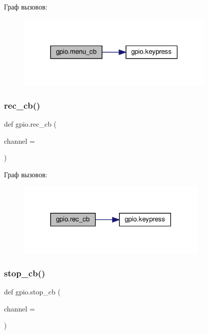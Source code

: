 Граф вызовов\+:\nopagebreak
\begin{figure}[H]
\begin{center}
\leavevmode
\includegraphics[width=270pt]{namespacegpio_a67087cfb10312de7d9b64c388777585f_cgraph}
\end{center}
\end{figure}
\mbox{\label{namespacegpio_a29bb86ae5be5d1d6f4f2e8783480a8cd}} 
\subsubsection{\texorpdfstring{rec\+\_\+cb()}{rec\_cb()}}
{\footnotesize\ttfamily def gpio.\+rec\+\_\+cb (\begin{DoxyParamCaption}\item[{}]{channel = {} }\end{DoxyParamCaption})}

Граф вызовов\+:\nopagebreak
\begin{figure}[H]
\begin{center}
\leavevmode
\includegraphics[width=260pt]{namespacegpio_a29bb86ae5be5d1d6f4f2e8783480a8cd_cgraph}
\end{center}
\end{figure}
\mbox{\label{namespacegpio_a3d6472f268230baafcc5895596b07a6a}} 
\subsubsection{\texorpdfstring{stop\+\_\+cb()}{stop\_cb()}}
{\footnotesize\ttfamily def gpio.\+stop\+\_\+cb (\begin{DoxyParamCaption}\item[{}]{channel = {} }\end{DoxyParamCaption})}

